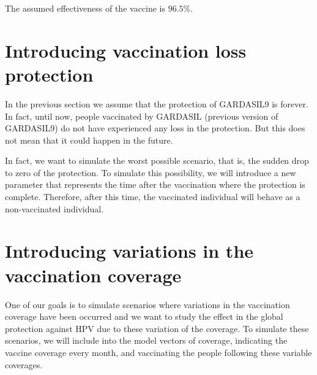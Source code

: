 The assumed effectiveness of the vaccine is $96.5\%$.

\section{Introducing vaccination loss protection}
In the previous section we assume that the protection of GARDASIL9 is forever. In fact, until now, people vaccinated by GARDASIL (previous version of GARDASIL9) do not have experienced any loss in the protection. But this does not mean that it could happen in the future. 

In fact, we want to simulate the worst possible scenario, that is, the sudden drop to zero of the protection. To simulate this possibility, we will introduce a new parameter that represents the time after the vaccination where the protection is complete. Therefore, after this time, the vaccinated individual will behave as a non-vaccinated individual.

\section{Introducing variations in the vaccination coverage}
One of our goals is to simulate scenarios where variations in the vaccination coverage have been occurred and we want to study the effect in the global protection against HPV due to these variation of the coverage. To simulate these scenarios, we will include into the model vectors of coverage, indicating the vaccine coverage every month, and vaccinating the people following these variable coverages. 
